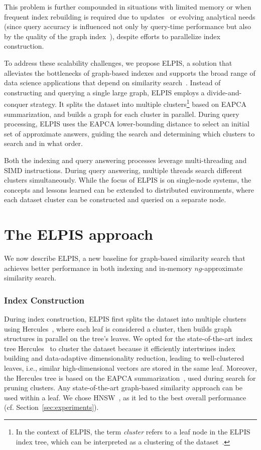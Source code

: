 This problem is further compounded in situations with limited memory or when frequent index rebuilding is required due to updates~\cite{nsg} or evolving analytical needs (since query accuracy is influenced not only by query-time performance but also by the quality of the graph index~\cite{hydra2}), despite efforts to parallelize index construction.

To address these scalability challenges, we propose ELPIS, a solution that alleviates the bottlenecks of graph-based indexes and supports the broad range of data science applications that depend on similarity search~\cite{conf/sigmod/echihabi2020,DBLP:conf/wims/EchihabiZP20,highd-vldb-tutorial}. Instead of constructing and querying a single large graph, ELPIS employs a divide-and-conquer strategy. It splits the dataset into multiple clusters\footnote{In the context of ELPIS, the term \emph{cluster} refers to a leaf node in the ELPIS index tree, which can be interpreted as a clustering of the dataset~\cite{new-jersey-report}.} based on EAPCA summarization, and builds a graph for each cluster in parallel. During query processing, ELPIS uses the EAPCA lower-bounding distance to select an initial set of approximate answers, guiding the search and determining which clusters to search and in what order.

Both the indexing and query answering processes leverage multi-threading and SIMD instructions. During query answering, multiple threads search different clusters simultaneously. While the focus of ELPIS is on single-node systems, the concepts and lessons learned can be extended to distributed environments, where each dataset cluster can be constructed and queried on a separate node.
\section{The ELPIS approach}

We now describe ELPIS, a new baseline for graph-based similarity search that achieves better performance in both indexing and in-memory $ng$-approximate similarity search.

\subsubsection{Index Construction}

During index construction, ELPIS first splits the dataset into multiple clusters using Hercules~\cite{hercules}, where each leaf is considered a cluster, then builds graph structures in parallel on the tree's leaves. 
We opted for the state-of-the-art index tree Hercules~\cite{hercules} to cluster the dataset because it efficiently intertwines index building and data-adaptive dimensionality reduction, leading to well-clustered leaves, i.e., similar high-dimensional vectors are stored in the same leaf. 
Moreover, the Hercules tree is based on the EAPCA summarization~\cite{dstree}, 
used during search for pruning clusters. 
Any state-of-the-art graph-based similarity approach can be used within a leaf. 
We chose HNSW~\cite{hnsw}, as it led to the best overall performance (cf. Section~\ref{sec:experiments}).

